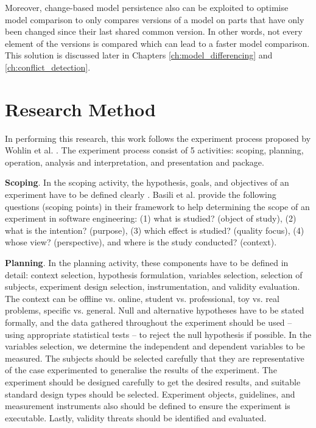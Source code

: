 Moreover, change-based model persistence also can be exploited to optimise model comparison to only compares versions of a model on parts that have only been changed since their last shared common version. In other words, not every element of the versions is compared which can lead to a faster model comparison. This solution is discussed later in Chapters \ref{ch:model_differencing} and \ref{ch:conflict_detection}. 

\section{Research Method}
\label{sec:research_method}
In performing this research, this work follows the experiment process proposed by Wohlin et al. \cite{DBLP:books/daglib/0029933/Wohlin}. The experiment process consist of 5 activities: scoping, planning, operation, analysis and interpretation, and presentation and package.

\textbf{Scoping}. In the scoping activity, the hypothesis, goals, and objectives of an experiment have to be defined clearly \cite{DBLP:books/daglib/0029933/Wohlin}. Basili et al. \cite{basili1988tame} provide the following questions (scoping points) in their framework to help determining the scope of an experiment in software engineering: (1) what is studied? (object of study), (2) what is the intention? (purpose), (3) which effect is studied? (quality focus), (4) whose view? (perspective), and where is the study conducted? (context).

\textbf{Planning}. In the planning activity, these components have to be defined in detail: context selection, hypothesis formulation, variables selection, selection of subjects, experiment design selection, instrumentation, and validity evaluation\cite{DBLP:books/daglib/0029933/Wohlin}. The context can be offline vs. online, student vs. professional, toy vs. real problems, specific vs. general. Null and alternative hypotheses have to be stated formally, and the data gathered throughout the experiment should be used -- using appropriate statistical tests -- to reject the null hypothesis if possible. In the variables selection, we determine the independent and dependent variables to be measured. The subjects should be selected carefully that they are representative of the case experimented to generalise the results of the experiment. The experiment should be designed carefully to get the desired results, and suitable standard design types should be selected. Experiment objects, guidelines, and measurement instruments also should be defined to ensure the experiment is executable. Lastly, validity threats should be identified and evaluated.


